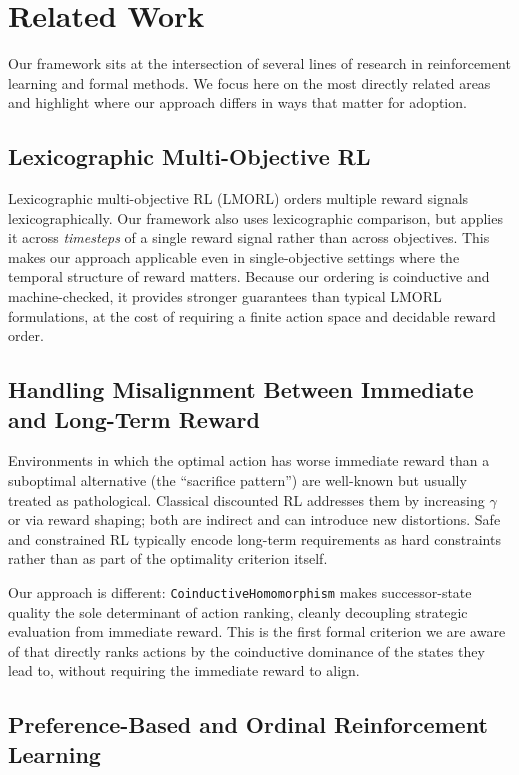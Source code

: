 \documentclass[runningheads]{llncs}
\begin{document}
\section{Related Work}

Our framework sits at the intersection of several lines of research in reinforcement learning and formal methods.  We focus here on the most directly related areas and highlight where our approach differs in ways that matter for adoption.

\subsection{Lexicographic Multi-Objective RL}

Lexicographic multi-objective RL (LMORL) \cite{Skalse2022,Tercan2024} orders multiple reward signals lexicographically.  Our framework also uses lexicographic comparison, but applies it across \emph{timesteps} of a single reward signal rather than across objectives.  This makes our approach applicable even in single-objective settings where the temporal structure of reward matters.  Because our ordering is coinductive and machine-checked, it provides stronger guarantees than typical LMORL formulations, at the cost of requiring a finite action space and decidable reward order.

\subsection{Handling Misalignment Between Immediate and Long-Term Reward}

Environments in which the optimal action has worse immediate reward than a suboptimal alternative (the ``sacrifice pattern'') are well-known but usually treated as pathological.  Classical discounted RL addresses them by increasing $\gamma$ or via reward shaping; both are indirect and can introduce new distortions.  Safe and constrained RL \cite{Garcia2015} typically encode long-term requirements as hard constraints rather than as part of the optimality criterion itself.

Our approach is different: \texttt{CoinductiveHomomorphism} makes successor-state quality the sole determinant of action ranking, cleanly decoupling strategic evaluation from immediate reward.  This is the first formal criterion we are aware of that directly ranks actions by the coinductive dominance of the states they lead to, without requiring the immediate reward to align.

\subsection{Preference-Based and Ordinal Reinforcement Learning}
\end{document}
